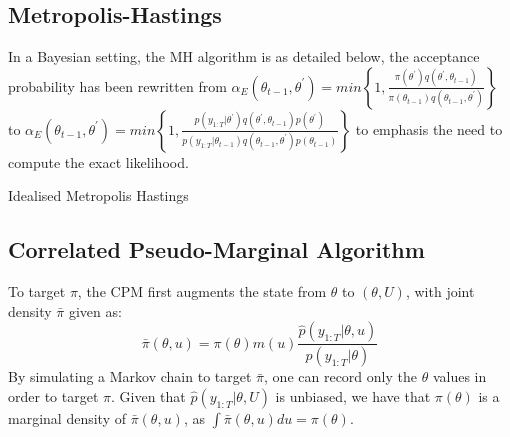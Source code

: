 \documentclass{article}
\makeatletter
\def\BState{\State\hskip-\ALG@thistlm}
\makeatother
\begin{document}
\subsection{Metropolis-Hastings}
In a Bayesian setting, the MH algorithm is as detailed below, the acceptance probability has been rewritten from $\alpha_E(\theta_{t-1}, \theta^\prime) = min\left\{1,  \frac{
                \pi(\theta^\prime) q(\theta^\prime, \theta_{t-1})}
                {\pi(\theta_{t-1}) q(\theta_{t-1}, \theta^\prime)}\right\}$ to
 $ \alpha_E(\theta_{t-1}, \theta^\prime) = min\left\{1,  \frac{
                p(y_{1:T}| \theta^\prime) q(\theta^\prime, \theta_{t-1})p(\theta^\prime)}
                {p(y_{1:T}| \theta_{t-1}) q(\theta_{t-1}, \theta^\prime)p(\theta_{t-1})}
\right\} $ to emphasis the need to compute the exact likelihood.

\begin{algorithm}[H]
\caption{Idealised Metropolis Hastings}\label{euclid}
\end{algorithm}


\subsection{Correlated Pseudo-Marginal Algorithm} \label{cpm}
To target $\pi$, the CPM first augments the state from $\theta$ to $(\theta, U)$, with joint density $\bar{\pi}$ given as:
$$\bar{\pi}(\theta, u) = \pi(\theta)m(u)\frac{\hat{p}(y_{1:T}| \theta, u)}{p(y_{1:T}| \theta)}$$
By simulating a Markov chain to target $\bar{\pi}$, one can record only the $\theta$ values in order to target $\pi$. Given that $\hat{p} (y_{1:T} | \theta, U)$ is unbiased, we have that $\pi(\theta)$ is a marginal density of $\bar{\pi} (\theta, u)$, as $\int \bar{\pi}(\theta,u)du = \pi(\theta)$. \\
\end{document}

